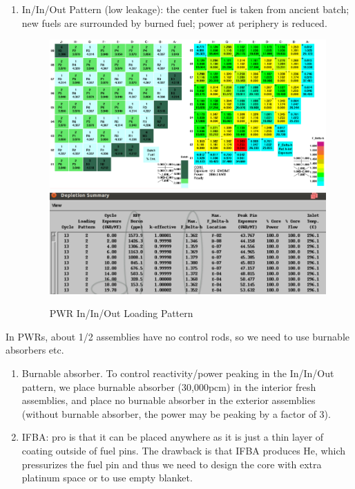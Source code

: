 \documentclass{school-22.211-notes}
\begin{document}
\begin{enumerate}
\item In/In/Out Pattern (low leakage): the center fuel is taken from ancient batch; new fuels are surrounded by burned fuel; power at periphery is reduced. 
\begin{figure}[ht]
  \centering
  \includegraphics[width=5in]{images/design/PWR-in-in-out.png}
  \includegraphics[width=5in]{images/design/PWR-in-in-out-2.png}
  \caption{PWR In/In/Out Loading Pattern} \label{PWR-in-in-out}
\end{figure}
\end{enumerate}


In PWRs, about 1/2 assemblies have no control rods, so we need to use burnable absorbers etc. 
\begin{enumerate}
\item Burnable absorber. To control reactivity/power peaking in the In/In/Out pattern, we place burnable absorber (30,000pcm) in the interior fresh assemblies, and place no burnable absorber in the exterior assemblies (without burnable absorber, the power may be peaking by a factor of 3). 

\item IFBA: pro is that it can be placed anywhere as it is just a thin layer of coating outside of fuel pins. The drawback is that IFBA produces He, which pressurizes the fuel pin and thus we need to design the core with extra platinum space or to use empty blanket. 
\end{enumerate}
\end{document}
